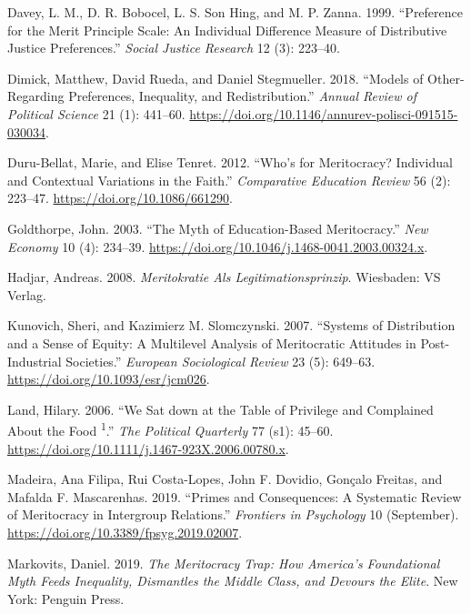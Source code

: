 \documentclass[
]{article}
\begin{document}
\leavevmode\hypertarget{ref-davey_preference_1999}{}%
Davey, L. M., D. R. Bobocel, L. S. Son Hing, and M. P. Zanna. 1999. ``Preference for the Merit Principle Scale: An Individual Difference Measure of Distributive Justice Preferences.'' \emph{Social Justice Research} 12 (3): 223--40.

\leavevmode\hypertarget{ref-dimick_Models_2018}{}%
Dimick, Matthew, David Rueda, and Daniel Stegmueller. 2018. ``Models of Other-Regarding Preferences, Inequality, and Redistribution.'' \emph{Annual Review of Political Science} 21 (1): 441--60. \url{https://doi.org/10.1146/annurev-polisci-091515-030034}.

\leavevmode\hypertarget{ref-duru-bellat_whos_2012}{}%
Duru-Bellat, Marie, and Elise Tenret. 2012. ``Who's for Meritocracy? Individual and Contextual Variations in the Faith.'' \emph{Comparative Education Review} 56 (2): 223--47. \url{https://doi.org/10.1086/661290}.

\leavevmode\hypertarget{ref-goldthorpe_myth_2003}{}%
Goldthorpe, John. 2003. ``The Myth of Education-Based Meritocracy.'' \emph{New Economy} 10 (4): 234--39. \url{https://doi.org/10.1046/j.1468-0041.2003.00324.x}.

\leavevmode\hypertarget{ref-hadjar_meritokratie_2008}{}%
Hadjar, Andreas. 2008. \emph{Meritokratie Als Legitimationsprinzip}. Wiesbaden: VS Verlag.

\leavevmode\hypertarget{ref-kunovich_systems_2007}{}%
Kunovich, Sheri, and Kazimierz M. Slomczynski. 2007. ``Systems of Distribution and a Sense of Equity: A Multilevel Analysis of Meritocratic Attitudes in Post-Industrial Societies.'' \emph{European Sociological Review} 23 (5): 649--63. \url{https://doi.org/10.1093/esr/jcm026}.

\leavevmode\hypertarget{ref-landWeSatTable2006}{}%
Land, Hilary. 2006. ``We Sat down at the Table of Privilege and Complained About the Food \textsuperscript{1}.'' \emph{The Political Quarterly} 77 (s1): 45--60. \url{https://doi.org/10.1111/j.1467-923X.2006.00780.x}.

\leavevmode\hypertarget{ref-MadeiraPrimesConsequencesSystematic2019}{}%
Madeira, Ana Filipa, Rui Costa-Lopes, John F. Dovidio, Gonçalo Freitas, and Mafalda F. Mascarenhas. 2019. ``Primes and Consequences: A Systematic Review of Meritocracy in Intergroup Relations.'' \emph{Frontiers in Psychology} 10 (September). \url{https://doi.org/10.3389/fpsyg.2019.02007}.

\leavevmode\hypertarget{ref-markovits_Meritocracy_2019}{}%
Markovits, Daniel. 2019. \emph{The Meritocracy Trap: How America's Foundational Myth Feeds Inequality, Dismantles the Middle Class, and Devours the Elite}. New York: Penguin Press.
\end{document}
